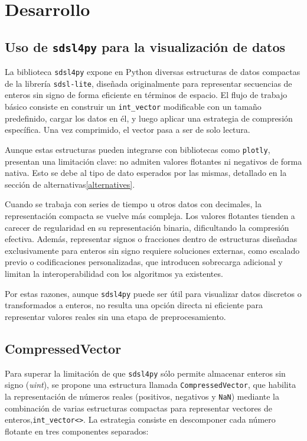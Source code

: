 \chapter{Desarrollo}


\section{Uso de \texttt{sdsl4py} para la visualización de datos}

La biblioteca \texttt{sdsl4py} expone en Python diversas estructuras de datos compactas de la librería \texttt{sdsl-lite}, diseñada originalmente para representar secuencias de enteros sin signo de forma eficiente en términos de espacio. El flujo de trabajo básico consiste en construir un \texttt{int\_vector} modificable con un tamaño predefinido, cargar los datos en él, y luego aplicar una estrategia de compresión específica. Una vez comprimido, el vector pasa a ser de solo lectura.

Aunque estas estructuras pueden integrarse con bibliotecas como \texttt{plotly}, presentan una limitación clave: no admiten valores flotantes ni negativos de forma nativa. Esto se debe al tipo de dato esperados por las mismas, detallado en la sección de alternativas\ref{alternatives}.

Cuando se trabaja con series de tiempo u otros datos con decimales, la representación compacta se vuelve más compleja. Los valores flotantes tienden a carecer de regularidad en su representación binaria, dificultando la compresión efectiva. Además, representar signos o fracciones dentro de estructuras diseñadas exclusivamente para enteros sin signo requiere soluciones externas, como escalado previo o codificaciones personalizadas, que introducen sobrecarga adicional y limitan la interoperabilidad con los algoritmos ya existentes.

Por estas razones, aunque \texttt{sdsl4py} puede ser útil para visualizar datos discretos o transformados a enteros, no resulta una opción directa ni eficiente para representar valores reales sin una etapa de preprocesamiento.


\section{CompressedVector}

Para superar la limitación de que \texttt{sdsl4py} sólo permite almacenar enteros sin signo (\textit{uint}), se propone una estructura llamada \texttt{CompressedVector}, que habilita la representación de números reales (positivos, negativos y \texttt{NaN}) mediante la combinación de varias estructuras compactas para representar vectores de enteros,\texttt{int\_vector<>}. La estrategia consiste en descomponer cada número flotante en tres componentes separados:

